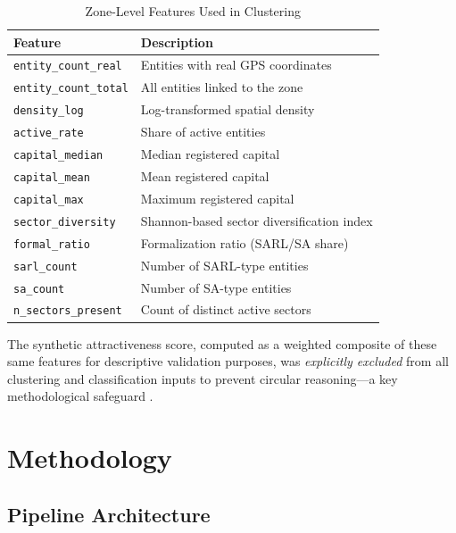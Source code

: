 \documentclass[conference]{IEEEtran}
\begin{document}
\begin{table}[htbp]
\caption{Zone-Level Features Used in Clustering}
\label{tab:features}
\begin{center}
\begin{tabular}{|l|p{5cm}|}
\hline
\textbf{Feature} & \textbf{Description} \\
\hline
\texttt{entity\_count\_real} & Entities with real GPS coordinates \\
\texttt{entity\_count\_total} & All entities linked to the zone \\
\texttt{density\_log} & Log-transformed spatial density \\
\texttt{active\_rate} & Share of active entities \\
\texttt{capital\_median} & Median registered capital \\
\texttt{capital\_mean} & Mean registered capital \\
\texttt{capital\_max} & Maximum registered capital \\
\texttt{sector\_diversity} & Shannon-based sector diversification index \\
\texttt{formal\_ratio} & Formalization ratio (SARL/SA share) \\
\texttt{sarl\_count} & Number of SARL-type entities \\
\texttt{sa\_count} & Number of SA-type entities \\
\texttt{n\_sectors\_present} & Count of distinct active sectors \\
\hline
\end{tabular}
\end{center}
\end{table}

The synthetic attractiveness score, computed as a weighted composite
of these same features for descriptive validation purposes, was
\textit{explicitly excluded} from all clustering and classification
inputs to prevent circular reasoning---a key methodological
safeguard \cite{sakti2024machine}.

\section{Methodology}
\label{sec:method}

\subsection{Pipeline Architecture}
\end{document}
